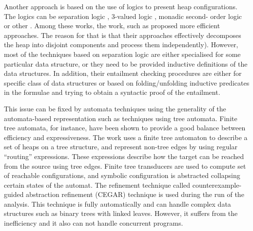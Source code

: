 Another approach is %
 based on the use of logics to present heap configurations. The logics can be separation logic \cite{John:SL, Stephen:SL,JoshCris:SL,Hongseok:SL,Kamil:SL,Chin:SL,Quang:SL, Ruzica:SL, Constrantin:SL}, 3-valued logic \cite{SagivRW02}, monadic second- order logic \cite{Ander:ML, Jakob:ML,Madhusudan:ML} or other \cite{Shmuel:Shape, Karen:Shape}. Among these works, the work, such as \cite{JoshCris:SL,Hongseok:SL, Quang:SL} proposed more efficient approaches. The reason for that is that their approaches effectively decomposes the heap into disjoint components and process them independently). However, most of the techniques based on separation logic are either specialised for some particular data structure, or they need to be provided inductive definitions of the data structures. In addition, their entailment checking procedures are either for specific class of data structures or based on folding/unfolding inductive predicates in the formulae and trying to obtain a syntactic proof of the entailment. 

 
This issue can be fixed by automata techniques using the generality of the automata-based representation such as techniques using tree automata. Finite tree automata, for instance, have been shown to provide a good balance between efficiency and expressiveness. The work \cite{Ahmed:TreeAutomata} uses a finite tree automaton to describe a set of heaps on a tree structure,
and represent non-tree edges by using regular “routing” expressions. These expressions
describe how the target can be reached from the source using tree edges. Finite tree transducers
are used to compute set of reachable configurations, and symbolic configuration is abstracted
collapsing certain states of the automat. The refinement technique called counterexample-guided
abstraction refinement (CEGAR) technique is used during the run of the analysis. This technique
is fully automatically and can handle complex data structures such as binary trees with linked
leaves. However, it suffers from the inefficiency and it also can not handle concurrent programs.

